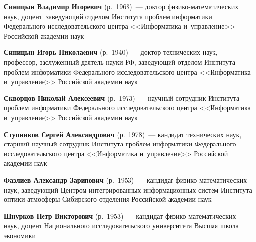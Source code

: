 \begin{multicols}{2}
\vspace*{1pt}


  
  \noindent
\textbf{Синицын Владимир Игоревич} (р.\ 1968)~--- 
доктор фи\-зи\-ко-ма\-те\-ма\-ти\-че\-ских наук, доцент, 
заведующий отделом Института проб\-лем информатики
Федерального исследовательского центра
<<Информатика и~управ\-ле\-ние>> Российской академии наук

\vspace*{1pt}
\noindent
  \textbf{Синицын Игорь Николаевич} (р.\ 1940)~--- доктор технических наук,
  профессор, заслуженный деятель науки РФ, заведующий отделом Института
  проб\-лем информатики Федерального исследовательского центра
  <<Информатика и~управ\-ле\-ние>> Российской академии наук

\vspace*{1pt}

\noindent
\textbf{Скворцов Николай Алексеевич} (р.\ 1973)~---
научный сотрудник Института проб\-лем информатики Федерального исследовательского 
центра <<Информатика и~управ\-ле\-ние>> Российской академии наук  %

\vspace*{1pt}

\noindent
\textbf{Ступников Сергей Александрович} (р.\ 1978)~---
кандидат технических наук, старший научный сотрудник Института проб\-лем 
информатики Федерального исследовательского центра <<Информатика и~управ\-ление>> 
Российской академии наук %

\vspace*{1pt}

\noindent
\textbf{Фазлиев Александр Зарипович} (р.\ 1953)~---
кандидат фи\-зи\-ко-ма\-те\-ма\-ти\-че\-ских наук, заведующий Цент\-ром 
интегрированных информационных сис\-тем Института оптики атмосферы Сибирского 
отделения Российской академии наук

\vspace*{1pt}

 \noindent
\textbf{Шнурков Петр Викторович} (р.\ 1953)~--- 
кандидат фи\-зи\-ко-ма\-те\-ма\-ти\-че\-ских наук, доцент 
Национального исследовательского университета Высшая школа экономики




 \label{end\stat}










\end{multicols}

\newpage